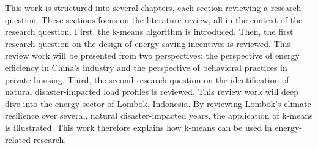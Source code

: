 This work is structured into several chapters, each section reviewing a research question.
These sections focus on the literature review, all in the context of the research question.
First, the k-means algorithm is introduced.
Then, the first research question on the design of energy-saving incentives is reviewed.
This review work will be presented from two perspectives: the perspective of energy efficiency in China's industry and the perspective of behavioral practices in private housing.
Third, the second research question on the identification of natural disaster-impacted load profiles is reviewed.
This review work will deep dive into the energy sector of Lombok, Indonesia.
By reviewing Lombok's climate resilience over several, natural disaster-impacted years, the application of k-means is illustrated.
This work therefore explains how k-means can be used in energy-related research.